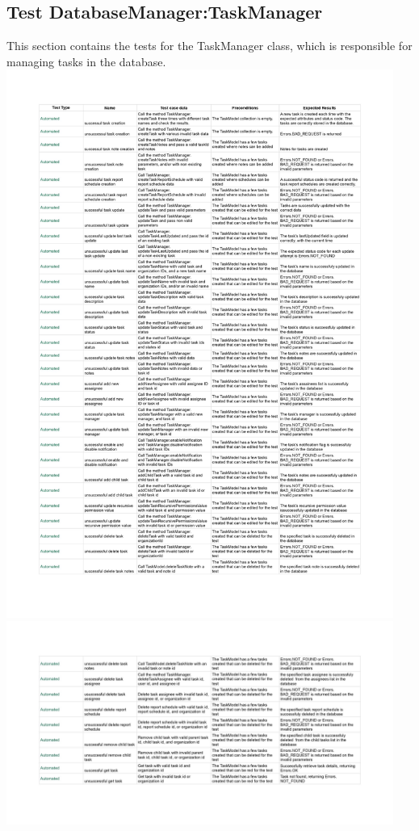\documentclass{article}
\begin{document}
\subsection*{Test DatabaseManager:TaskManager}
This section contains the tests for the TaskManager class, which is responsible for managing tasks in the database.
\newline
\includegraphics[width=0.95\textwidth]{images/Test_DatabaseManagerTaskManager-immagini-0.jpg}
\newline
\includegraphics[width=0.95\textwidth]{images/Test_DatabaseManagerTaskManager-immagini-1.jpg}
\end{document}
